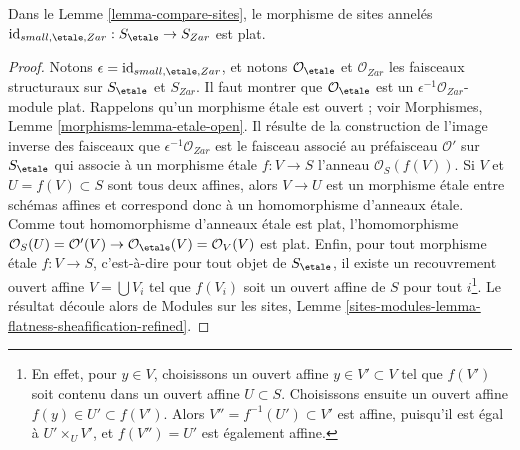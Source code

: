 \begin{lemma}
\label{lemma-compare-etale-zariski-flat}
Dans le Lemme \ref{lemma-compare-sites}, le morphisme de sites annelés
$\text{id}_{small, \etale, Zar} : S_\etale \to S_{Zar}$ est plat.
\end{lemma}

\begin{proof}
Notons $\epsilon = \text{id}_{small, \etale, Zar}$, et notons
$\mathcal{O}_\etale$ et $\mathcal{O}_{Zar}$ les faisceaux structuraux sur
$S_\etale$ et $S_{Zar}$. Il faut montrer que $\mathcal{O}_\etale$ est un
$\epsilon^{-1}\mathcal{O}_{Zar}$-module plat. Rappelons qu'un morphisme
\'etale est ouvert ; voir Morphismes, Lemme
\ref{morphisms-lemma-etale-open}. Il résulte de la construction de l'image
inverse des faisceaux que $\epsilon^{-1}\mathcal{O}_{Zar}$ est le faisceau
associé au préfaisceau $\mathcal{O}'$ sur $S_\etale$ qui associe à un
morphisme \'etale $f : V \to S$ l'anneau $\mathcal{O}_S(f(V))$. Si $V$ et
$U = f(V) \subset S$ sont tous deux affines, alors $V \to U$ est un
morphisme \'etale entre schémas affines et correspond donc à un homomorphisme
d'anneaux \'etale. Comme tout homomorphisme d'anneaux \'etale est plat,
l'homomorphisme
$\mathcal{O}_S(U) = \mathcal{O}'(V) \to
\mathcal{O}_\etale(V) = \mathcal{O}_V(V)$ est plat.
Enfin, pour tout morphisme \'etale $f : V \to S$, c'est-à-dire pour tout
objet de $S_\etale$, il existe un recouvrement ouvert affine
$V = \bigcup V_i$ tel que $f(V_i)$ soit un ouvert affine de $S$ pour tout
$i$\footnote{En effet, pour $y \in V$, choisissons un ouvert affine
$y \in V' \subset V$ tel que $f(V')$ soit contenu dans un ouvert affine
$U \subset S$. Choisissons ensuite un ouvert affine
$f(y) \in U' \subset f(V')$. Alors $V'' = f^{-1}(U') \subset V'$ est affine,
puisqu'il est égal à $U' \times_U V'$, et $f(V'') = U'$ est également affine.}.
Le résultat découle alors de Modules sur les sites, Lemme
\ref{sites-modules-lemma-flatness-sheafification-refined}.
\end{proof}


